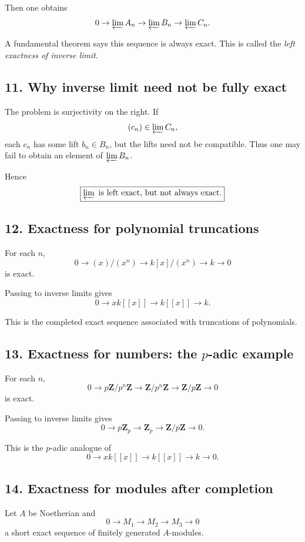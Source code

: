 \documentclass[12pt,a4paper]{article}
\theoremstyle{plain}
\theoremstyle{definition}      %
\begin{document}
	Then one obtains
	\[
	0\to \varprojlim A_n \to \varprojlim B_n \to \varprojlim C_n.
	\]
	
	A fundamental theorem says this sequence is always exact. This is called the \emph{left exactness of inverse limit}.
	
	\subsection*{11. Why inverse limit need not be fully exact}
	
	The problem is surjectivity on the right. If
	\[
	(c_n)\in \varprojlim C_n,
	\]
	each \(c_n\) has some lift \(b_n\in B_n\), but the lifts need not be compatible. Thus one may fail to obtain an element of \(\varprojlim B_n\).
	
	Hence
	\[
	\boxed{\varprojlim \text{ is left exact, but not always exact.}}
	\]
	
	\subsection*{12. Exactness for polynomial truncations}
	
	For each \(n\),
	\[
	0\to (x)/(x^n)\to k[x]/(x^n)\to k\to 0
	\]
	is exact.
	
	Passing to inverse limits gives
	\[
	0\to xk[[x]]\to k[[x]]\to k.
	\]
	
	This is the completed exact sequence associated with truncations of polynomials.
	
	\subsection*{13. Exactness for numbers: the \(p\)-adic example}
	
	For each \(n\),
	\[
	0\to p\mathbf Z/p^n\mathbf Z \to \mathbf Z/p^n\mathbf Z \to \mathbf Z/p\mathbf Z \to 0
	\]
	is exact.
	
	Passing to inverse limits gives
	\[
	0\to p\mathbf Z_p \to \mathbf Z_p \to \mathbf Z/p\mathbf Z \to 0.
	\]
	
	This is the \(p\)-adic analogue of
	\[
	0\to xk[[x]]\to k[[x]]\to k\to 0.
	\]
	
	\subsection*{14. Exactness for modules after completion}
	
	Let \(A\) be Noetherian and
	\[
	0\to M_1\to M_2\to M_3\to 0
	\]
	a short exact sequence of finitely generated \(A\)-modules.
	
\end{document}
